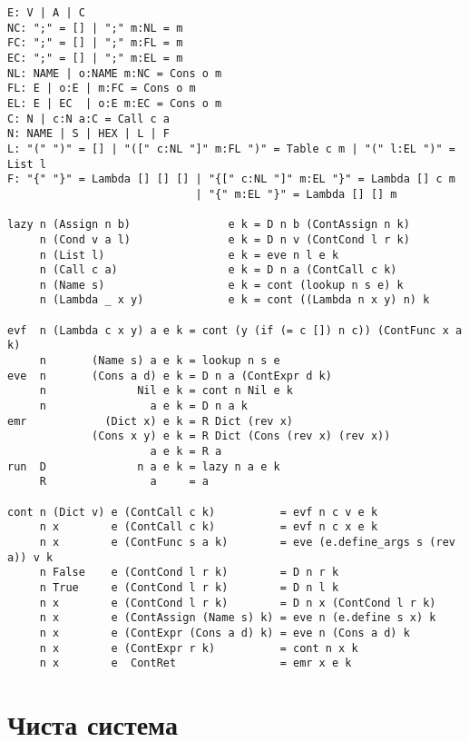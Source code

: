 \begin{lstlisting}[mathescape=true]
E: V | A | C
NC: ";" = [] | ";" m:NL = m
FC: ";" = [] | ";" m:FL = m
EC: ";" = [] | ";" m:EL = m
NL: NAME | o:NAME m:NC = Cons o m
FL: E | o:E | m:FC = Cons o m
EL: E | EC  | o:E m:EC = Cons o m
C: N | c:N a:C = Call c a
N: NAME | S | HEX | L | F
L: "(" ")" = [] | "([" c:NL "]" m:FL ")" = Table c m | "(" l:EL ")" = List l
F: "{" "}" = Lambda [] [] [] | "{[" c:NL "]" m:EL "}" = Lambda [] c m
                             | "{" m:EL "}" = Lambda [] [] m

lazy n (Assign n b)               e k = D n b (ContAssign n k)
     n (Cond v a l)               e k = D n v (ContCond l r k)
     n (List l)                   e k = eve n l e k
     n (Call c a)                 e k = D n a (ContCall c k)
     n (Name s)                   e k = cont (lookup n s e) k
     n (Lambda _ x y)             e k = cont ((Lambda n x y) n) k

evf  n (Lambda c x y) a e k = cont (y (if (= c []) n c)) (ContFunc x a k)
     n       (Name s) a e k = lookup n s e
eve  n       (Cons a d) e k = D n a (ContExpr d k)
     n              Nil e k = cont n Nil e k
     n                a e k = D n a k
emr            (Dict x) e k = R Dict (rev x)
             (Cons x y) e k = R Dict (Cons (rev x) (rev x))
                      a e k = R a
run  D              n a e k = lazy n a e k
     R                a     = a

cont n (Dict v) e (ContCall c k)          = evf n c v e k
     n x        e (ContCall c k)          = evf n c x e k
     n x        e (ContFunc s a k)        = eve (e.define_args s (rev a)) v k
     n False    e (ContCond l r k)        = D n r k
     n True     e (ContCond l r k)        = D n l k
     n x        e (ContCond l r k)        = D n x (ContCond l r k)
     n x        e (ContAssign (Name s) k) = eve n (e.define s x) k
     n x        e (ContExpr (Cons a d) k) = eve n (Cons a d) k
     n x        e (ContExpr r k)          = cont n x k
     n x        e  ContRet                = emr x e k
\end{lstlisting}

\newpage
\section{Чиста система}

